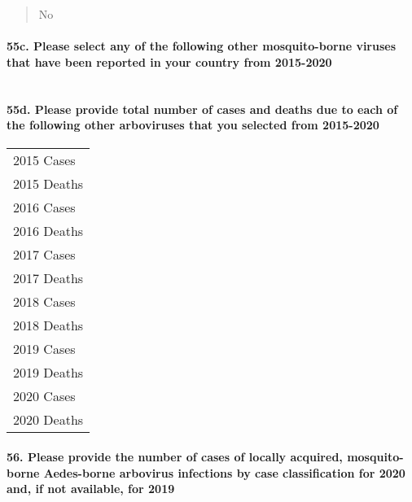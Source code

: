 \documentclass[
]{article}
\begin{document}
\begin{quote}
No
\end{quote}

\hypertarget{c.-please-select-any-of-the-following-other-mosquito-borne-viruses-that-have-been-reported-in-your-country-from-2015-2020}{%
\paragraph{55c. Please select any of the following other mosquito-borne
viruses that have been reported in your country from
2015-2020}\label{c.-please-select-any-of-the-following-other-mosquito-borne-viruses-that-have-been-reported-in-your-country-from-2015-2020}}

\begin{longtable}[]{@{}ll@{}}
\toprule
\endhead
\bottomrule
\end{longtable}

\hypertarget{d.-please-provide-total-number-of-cases-and-deaths-due-to-each-of-the-following-other-arboviruses-that-you-selected-from-2015-2020}{%
\paragraph{55d. Please provide total number of cases and deaths due to
each of the following other arboviruses that you selected from
2015-2020}\label{d.-please-provide-total-number-of-cases-and-deaths-due-to-each-of-the-following-other-arboviruses-that-you-selected-from-2015-2020}}

\begin{longtable}[]{@{}l@{}}
\toprule
\endhead
2015 Cases \\
2015 Deaths \\
2016 Cases \\
2016 Deaths \\
2017 Cases \\
2017 Deaths \\
2018 Cases \\
2018 Deaths \\
2019 Cases \\
2019 Deaths \\
2020 Cases \\
2020 Deaths \\
\bottomrule
\end{longtable}

\hypertarget{please-provide-the-number-of-cases-of-locally-acquired-mosquito-borne-aedes-borne-arbovirus-infections-by-case-classification-for-2020-and-if-not-available-for-2019}{%
\paragraph{56. Please provide the number of cases of locally acquired,
mosquito-borne Aedes-borne arbovirus infections by case classification
for 2020 and, if not available, for
2019}\label{please-provide-the-number-of-cases-of-locally-acquired-mosquito-borne-aedes-borne-arbovirus-infections-by-case-classification-for-2020-and-if-not-available-for-2019}}
\end{document}
